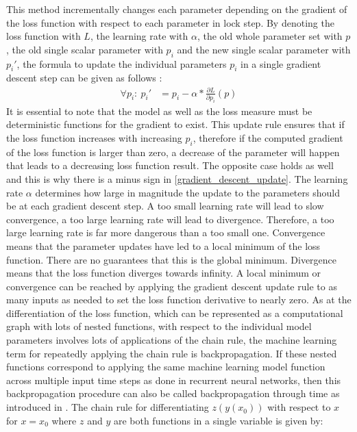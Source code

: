 \documentclass[draft,final]{vutinfth} %
\begin{document}
    This method incrementally changes each parameter depending on the gradient of the loss function with respect to each parameter in lock step.
    By denoting the loss function with $L$, the learning rate with $\alpha$, the old whole parameter set with $p$, the old single scalar parameter with $p_i$ and the new single scalar parameter with $p_i'$, the formula to update the individual parameters $p_i$ in a single gradient descent step can be given as follows \cite{GradientDescent}:
    \begin{align} 
        \label{gradient_descent_update}
        \forall p_i:~p_i' &= p_i - \alpha * \frac{\partial{L}}{\partial{p_i}}(p)
    \end{align}
    It is essential to note that the model as well as the loss measure must be deterministic functions for the gradient to exist.
    This update rule ensures that if the loss function increases with increasing $p_i$, therefore if the computed gradient of the loss function is larger than zero, a decrease of the parameter will happen that leads to a decreasing loss function result.
    The opposite case holds as well and this is why there is a minus sign in \ref{gradient_descent_update}.
    The learning rate $\alpha$ determines how large in magnitude the update to the parameters should be at each gradient descent step.
    A too small learning rate will lead to slow convergence, a too large learning rate will lead to divergence.
    Therefore, a too large learning rate is far more dangerous than a too small one.
    Convergence means that the parameter updates have led to a local minimum of the loss function.
    There are no guarantees that this is the global minimum. Divergence means that the loss function diverges towards infinity.
    A local minimum or convergence can be reached by applying the gradient descent update rule to as many inputs as needed to set the loss function derivative to nearly zero. 
    As at the differentiation of the loss function, which can be represented as a computational graph with lots of nested functions, with respect to the individual model parameters involves lots of applications of the chain rule, the machine learning term for repeatedly applying the chain rule is backpropagation.
    If these nested functions correspond to applying the same machine learning model function across multiple input time steps as done in recurrent neural networks, then this backpropagation procedure can also be called backpropagation through time as introduced in \cite{GradientDescent}.
    The chain rule for differentiating $z(y(x_0))$ with respect to $x$ for $x=x_0$ where $z$ and $y$ are both functions in a single variable is given by:
\end{document}
